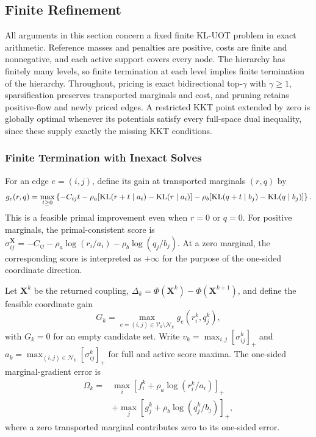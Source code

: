 \subsection{Finite Refinement}
\label{app:refinement-convergence}

All arguments in this section concern a fixed finite KL-UOT problem in exact arithmetic.
Reference masses and penalties are positive, costs are finite and nonnegative, and each active support covers every node.
The hierarchy has finitely many levels, so finite termination at each level implies finite termination of the hierarchy.
Throughout, pricing is exact bidirectional top-$\gamma$ with $\gamma\geq1$, sparsification preserves transported marginals and cost, and pruning retains positive-flow and newly priced edges.
A restricted KKT point extended by zero is globally optimal whenever its potentials satisfy every full-space dual inequality, since these supply exactly the missing KKT conditions.

\subsubsection{Finite Termination with Inexact Solves}
\label{app:refinement-inexact}

For an edge $e=(i,j)$, define its gain at transported marginals $(r,q)$ by
\begin{equation*}
g_e(r,q)=\max_{t\geq0}\left\{-C_{ij}t-\rho_a[\operatorname{KL}(r+t\mid a_i)-\operatorname{KL}(r\mid a_i)]-\rho_b[\operatorname{KL}(q+t\mid b_j)-\operatorname{KL}(q\mid b_j)]\right\}.
\end{equation*}
This is a feasible primal improvement even when $r=0$ or $q=0$.
For positive marginals, the primal-consistent score is $\sigma^\mathbf X_{ij}=-C_{ij}-\rho_a\log(r_i/a_i)-\rho_b\log(q_j/b_j)$.
At a zero marginal, the corresponding score is interpreted as $+\infty$ for the purpose of the one-sided coordinate direction.

Let $\mathbf X^k$ be the returned coupling, $\Delta_k=\Phi(\mathbf X^k)-\Phi(\mathbf X^{k+1})$, and define the feasible coordinate gain
\begin{equation*}
G_k=\max_{e=(i,j)\in\mathcal V_k\setminus\mathcal N_k}g_e(r_i^k,q_j^k),
\end{equation*}
with $G_k=0$ for an empty candidate set.
Write $v_k=\max_{i,j}[\sigma^k_{ij}]_+$ and $a_k=\max_{(i,j)\in\mathcal N_k}[\sigma^k_{ij}]_+$ for full and active score maxima.
The one-sided marginal-gradient error is
\begin{equation}
\label{eq:refinement-fidelity}
\begin{aligned}
\Omega_k={}&\max_i[f_i^k+\rho_a\log(r_i^k/a_i)]_+\\
&+\max_j[g_j^k+\rho_b\log(q_j^k/b_j)]_+,
\end{aligned}
\end{equation}
where a zero transported marginal contributes zero to its one-sided error.

